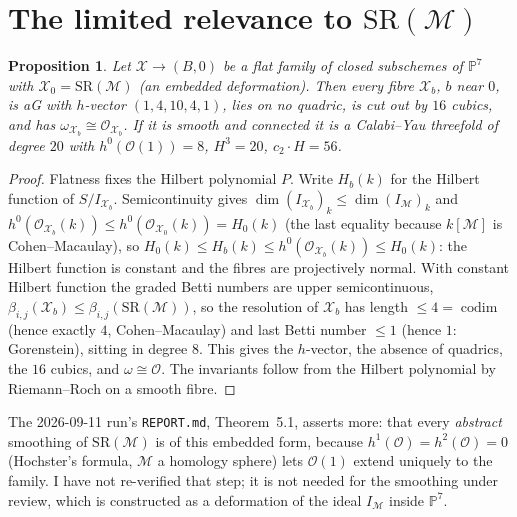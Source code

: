 \documentclass[10pt,a4paper]{article}
\theoremstyle{plain}
\newtheorem{proposition}[theorem]{Proposition}
\theoremstyle{definition}
\theoremstyle{remark}
\begin{document}
\section{The limited relevance to $\mathrm{SR}(\mathcal{M})$}

\begin{proposition}\label{prop:sr}
Let $\mathcal{X}\to(B,0)$ be a flat family of closed subschemes of
$\mathbb{P}^7$ with $\mathcal{X}_0=\mathrm{SR}(\mathcal{M})$ (an
embedded deformation). Then every fibre $\mathcal{X}_b$, $b$ near
$0$, is aG with $h$-vector $(1,4,10,4,1)$, lies on no quadric, is
cut out by $16$ cubics, and has
$\omega_{\mathcal{X}_b}\cong\mathcal{O}_{\mathcal{X}_b}$. If it is
smooth and connected it is a Calabi--Yau threefold of degree $20$
with $h^0(\mathcal{O}(1))=8$, $H^3=20$, $c_2\cdot H=56$.
\end{proposition}

\begin{proof}
Flatness fixes the Hilbert polynomial $P$. Write $H_b(k)$ for the
Hilbert function of $S/I_{\mathcal{X}_b}$. Semicontinuity gives
$\dim(I_{\mathcal{X}_b})_k\le\dim(I_{\mathcal{M}})_k$ and
$h^0(\mathcal{O}_{\mathcal{X}_b}(k))\le h^0(\mathcal{O}_{\mathcal{X}_0}(k))=H_0(k)$
(the last equality because $k[\mathcal{M}]$ is Cohen--Macaulay), so
$H_0(k)\le H_b(k)\le h^0(\mathcal{O}_{\mathcal{X}_b}(k))\le H_0(k)$:
the Hilbert function is constant and the fibres are projectively
normal. With constant Hilbert function the graded Betti numbers
are upper semicontinuous,
$\beta_{i,j}(\mathcal{X}_b)\le\beta_{i,j}(\mathrm{SR}(\mathcal{M}))$,
so the resolution of $\mathcal{X}_b$ has length $\le 4=\operatorname{codim}$
(hence exactly $4$, Cohen--Macaulay) and last Betti number $\le 1$
(hence $1$: Gorenstein), sitting in degree $8$. This gives the
$h$-vector, the absence of quadrics, the $16$ cubics, and
$\omega\cong\mathcal{O}$.
The invariants follow from the Hilbert polynomial by Riemann--Roch
on a smooth fibre.
\end{proof}

The 2026-09-11 run's \texttt{REPORT.md}, Theorem~5.1, asserts more:
that every \emph{abstract} smoothing of $\mathrm{SR}(\mathcal{M})$
is of this embedded form, because $h^1(\mathcal{O})=h^2(\mathcal{O})=0$
(Hochster's formula, $\mathcal{M}$ a homology sphere) lets
$\mathcal{O}(1)$ extend uniquely to the family. I have not
re-verified that step; it is not needed for the smoothing under
review, which is constructed as a deformation of the ideal
$I_{\mathcal{M}}$ inside $\mathbb{P}^7$.
\end{document}
